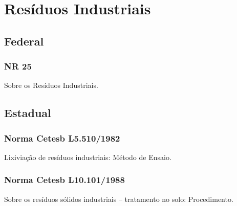 \section{Resíduos Industriais}
\begin{subapend}
	\subsection{Federal}
	\begin{subsubapend}
		\subsubsection{NR 25}
		Sobre os Resíduos Industriais.
	\end{subsubapend}
\end{subapend}

\begin{subapend}
	\subsection{Estadual}
	\begin{subsubapend}
		\subsubsection{Norma Cetesb L5.510/1982}
		Lixiviação de resíduos industriais: Método de Ensaio.
		\subsubsection{Norma Cetesb L10.101/1988}
		Sobre os resíduos sólidos industriais – tratamento no solo: Procedimento.
	\end{subsubapend}
\end{subapend}

